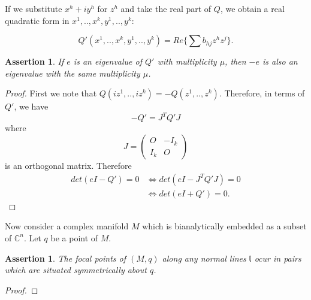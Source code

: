 \documentclass[a4paper,11pt,reqno]{amsart}
\newtheorem{asser}[thm]{Assertion}
\newcommand{\CC}{\mathbb{C}}
\begin{document}
If we substitute $x^h+iy^h$ for $z^h$ and take the real part of $Q$, we obtain a
real quadratic form in $x^1, .., x^k, y^1, .., y^k$:

\begin{equation}
  Q'(x^1, .., x^k, y^1, .., y^k) = Re\{\sum b_{hj}z^hz^j\}.
\end{equation}

\begin{asser}
  If $e$ is an eigenvalue of $Q'$ with multiplicity $\mu$, then $-e$ is also an
  eigenvalue with the same multiplicity $\mu$.
\end{asser}

\begin{proof}
  First we note that $Q(iz^1, .., iz^k) = -Q(z^1, .., z^k)$. Therefore, in terms
  of $Q'$, we have
  \begin{equation}
    -Q' = J^TQ'J
  \end{equation}
  where
  \begin{equation}
    J = 
    \left(
      \begin{matrix}
        O & -I_k \\
        I_k & O
      \end{matrix}
    \right)
  \end{equation}
  is an orthogonal matrix. Therefore
  \begin{equation}
    \begin{aligned}
      det(eI-Q') = 0 &\Leftrightarrow det(eI-J^TQ'J) = 0 \\
      &\Leftrightarrow det(eI+Q') = 0.      
    \end{aligned}
  \end{equation}
\end{proof}

Now consider a complex manifold $M$ which is bianalytically embedded as a subset
of $\CC^n$. Let $q$ be a point of $M$.

\begin{asser}
  The focal points of $(M, q)$ along any normal lines $\mathbb{l}$ ocur in pairs
  which are situated symmetrically about $q$.
\end{asser}

\begin{proof}
  
\end{proof}
\end{document}
